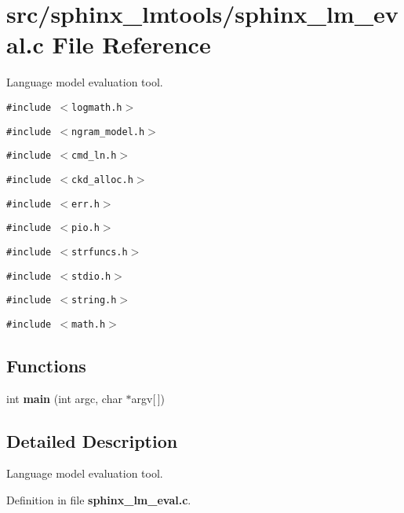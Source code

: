 \section{src/sphinx\_\-lmtools/sphinx\_\-lm\_\-eval.c File Reference}
\label{sphinx__lm__eval_8c}
Language model evaluation tool.  


{\tt \#include $<$logmath.h$>$}\par
{\tt \#include $<$ngram\_\-model.h$>$}\par
{\tt \#include $<$cmd\_\-ln.h$>$}\par
{\tt \#include $<$ckd\_\-alloc.h$>$}\par
{\tt \#include $<$err.h$>$}\par
{\tt \#include $<$pio.h$>$}\par
{\tt \#include $<$strfuncs.h$>$}\par
{\tt \#include $<$stdio.h$>$}\par
{\tt \#include $<$string.h$>$}\par
{\tt \#include $<$math.h$>$}\par
\subsection*{Functions}
\begin{CompactItemize}
\item 
int \textbf{main} (int argc, char $\ast$argv[$\,$])\label{sphinx__lm__eval_8c_0ddf1224851353fc92bfbff6f499fa97}

\end{CompactItemize}


\subsection{Detailed Description}
Language model evaluation tool. 



Definition in file {\bf sphinx\_\-lm\_\-eval.c}.
